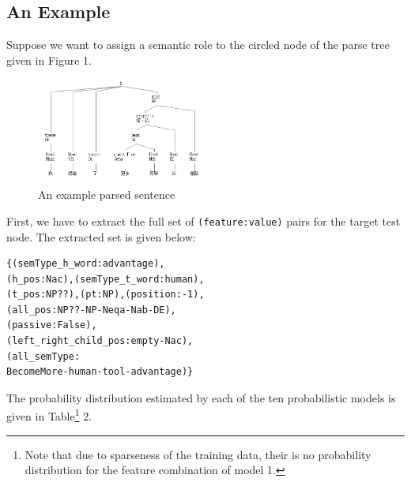 \subsection{An Example}
Suppose we want to assign a semantic role to the circled node of the parse tree given in Figure 1.
\begin{figure}[!h]
\centering
\includegraphics[width=.5\textwidth,height=3.5cm]{./examples/example3.png}
\caption{An example parsed sentence}
\end{figure}
\noindent First, we have to extract the full set of \verb+(feature:value)+ pairs for the target test node. The extracted set is given below:
\begin{verbatim}
{(semType_h_word:advantage),
(h_pos:Nac),(semType_t_word:human),
(t_pos:NP??),(pt:NP),(position:-1),
(all_pos:NP??-NP-Neqa-Nab-DE),
(passive:False),
(left_right_child_pos:empty-Nac),
(all_semType:
BecomeMore-human-tool-advantage)}
\end{verbatim}
The probability distribution estimated by each of the ten probabilistic models is given in Table\footnote{Note that due to sparseness of the training data, their is no probability distribution for the feature combination of model 1.} 2.

